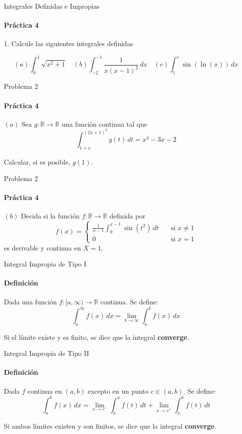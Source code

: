 \documentclass{plantillaPPT}
\begin{document}
\primeraDiapo
\begin{frame}{Integrales Definidas e Impropias}
\framesubtitle{Práctica 4}
1. Calcule las siguientes integrales definidas

\[(a)\int_0^1 \sqrt{x^2+1} \quad (b)\int_{-2}^{-1} \frac{1}{x(x-1)^2}\,dx \quad (c) \int_1^e \sin(\ln(x)) \,dx\]

\end{frame}
\begin{frame}{Problema 2}
\framesubtitle{Práctica 4}

\((a)\) Sea \(g:\mathbb{R}\to\mathbb{R}\) una función continua tal que
\[\int_{1+x}^{(2x+1)^2} g(t)\,dt = x^4-3x-2\]

Calcular, si es posible, \(g(1)\).
\end{frame}
\begin{frame}{Problema 2}
\framesubtitle{Práctica 4}
\((b)\) Decida si la función \(f:\mathbb{R}\to\mathbb{R}\) definida por
\[f(x) = 
\begin{cases}\displaystyle
    \frac{1}{x-1}\int_0^{x-1} \sin(t^2)\,dt\quad &\text{si } x\neq 1\\
    0 \quad &\text{si } x=1
\end{cases}\]
es derivable y continua en \(X=1\).
\end{frame}

\begin{frame}{Integral Impropia de Tipo I}
    \framesubtitle{Definición}
    \vspace{-0.5cm}

\begin{definicion}
Dada una función \( f:[a, \infty) \to \mathbb{R} \) continua. Se define:
\vspace{0.3cm}
\[
\int_a^{\infty} f(x) \, dx = \lim_{b \to \infty} \int_a^b f(x) \, dx
\]\vspace{0.3cm}

Si el límite existe y es finito, se dice que la integral \textbf{converge}.
\end{definicion}

\end{frame}

\begin{frame}{Integral Impropia de Tipo II}
    \framesubtitle{Definición}

\begin{definicion}
Dada \( f \) continua en \( (a, b) \) excepto en un punto \( c \in (a, b) \). Se define:
\vspace{0.3cm}
\[
\int_a^b f(x) \, dx = \lim_{x \to c^-} \int_a^x f(t) \, dt + \lim_{x \to c^+} \int_x^b f(t) \, dt
\]
\vspace{0.3cm}

Si ambos límites existen y son finitos, se dice que la integral \textbf{converge}.
\end{definicion}

\end{frame}
\end{document}

